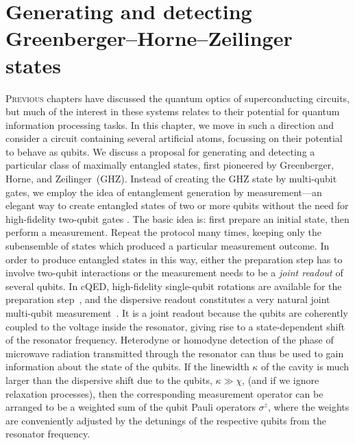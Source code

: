 %
\chapter[%
    \texorpdfstring{
        Generating and detecting Greenberger--Horne--Zeilinger states}%
    {Generating and detecting GHZ states}]
    {\selectfont
        Generating and detecting Greenberger--Horne--Zeilinger states}\label{ch:ghz}%
%
\lettrine{P}{revious} chapters have discussed the quantum optics of superconducting circuits, but much of the interest in these systems relates to their potential for quantum information processing tasks. In this chapter, we move in such a direction and consider a circuit containing several artificial atoms, focussing on their potential to behave as qubits. We discuss a proposal for generating and detecting a particular class of maximally entangled states, first pioneered by Greenberger, Horne, and Zeilinger~(GHZ)\@. Instead of creating the GHZ state by multi-qubit gates, we employ the idea of entanglement generation by measurement---an elegant way to create entangled states of two or more qubits without the need for high-fidelity two-qubit gates \cite{duan_long-distance_2001, ruskov_entanglement_2003, sarovar_high-fidelity_2005, maunz_quantum_2007, blais_quantum-information_2007}. The basic idea is: first prepare an initial state, then perform a measurement. Repeat the protocol many times, keeping only the subensemble of states which produced a particular measurement outcome. In order to produce entangled states in this way, either the preparation step has to involve two-qubit interactions or the measurement needs to be a \emph{joint readout} of several qubits. In cQED, high-fidelity single-qubit rotations are available for the preparation step~\cite{chow_2009}, and the dispersive readout constitutes a very natural joint multi-qubit measurement~\cite{blais_cavity_2004, wallra_strong_2004}.  It is a joint readout because the qubits are coherently coupled to the voltage inside the resonator, giving rise to a state-dependent shift of the resonator frequency.  Heterodyne or homodyne detection of the phase of microwave radiation transmitted through the resonator can thus be used to gain information about the state of the qubits. If the linewidth $\kappa$ of the cavity is much larger than the dispersive shift due to the qubits, $\kappa\gg\chi$, (and if we ignore relaxation processes), then the corresponding measurement operator can be arranged to be a weighted sum of the qubit Pauli operators $\sigma^z$, where the weights are conveniently adjusted by the detunings of the respective qubits from the resonator frequency.
